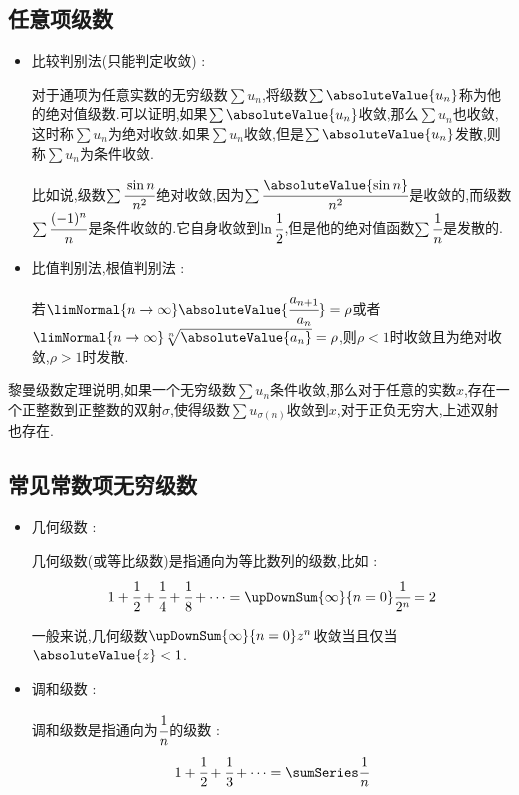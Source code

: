 {{{  \subsection{任意项级数}{

    \begin{itemize}
      \item {
            比较判别法(只能判定收敛) :

            对于通项为任意实数的无穷级数$\sum u_n$,将级数$\sum \absoluteValue{u_n}$称为他的绝对值级数.可以证明,如果$\sum \absoluteValue{u_n}$收敛,那么$\sum u_n$也收敛,这时称$\sum u_n$为绝对收敛.如果$\sum u_n$收敛,但是$\sum \absoluteValue{u_n}$发散,则称$\sum u_n$为条件收敛.

            比如说,级数$\sum \cfrac{\sin n}{n^2}$绝对收敛,因为$\sum \cfrac{\absoluteValue{\sin n}}{n^2}$是收敛的,而级数$\sum \cfrac{(-1)^n}{n}$是条件收敛的.它自身收敛到$\ln\cfrac{1}{2}$,但是他的绝对值函数$\sum \cfrac{1}{n}$是发散的.
            }
      \item {
            比值判别法,根值判别法 :

            若$\limNormal{n \to \infty} \absoluteValue{\cfrac{a_{n + 1}}{a_n}} = \rho$或者$\limNormal{n \to \infty}\sqrt[n]{\absoluteValue{a_n}} = \rho$,则$\rho < 1$时收敛且为绝对收敛,$\rho > 1$时发散.
            }
    \end{itemize}

    黎曼级数定理说明,如果一个无穷级数$\sum u_n$条件收敛,那么对于任意的实数$x$,存在一个正整数到正整数的双射$\sigma$,使得级数$\sum u_{\sigma(n)}$收敛到$x$,对于正负无穷大,上述双射也存在.
  }%

  \subsection{常见常数项无穷级数}{

    \begin{itemize}
      \item {
            几何级数 :

            几何级数(或等比级数)是指通向为等比数列的级数,比如 :
            $$
              1 + \cfrac{1}{2} + \cfrac{1}{4} + \cfrac{1}{8} + \dots = \upDownSum{\infty}{n = 0} \cfrac{1}{2^n} = 2
            $$

            一般来说,几何级数$\upDownSum{\infty}{n = 0}z^n$收敛当且仅当$\absoluteValue{z} < 1$.
            }
      \item{
            调和级数 :

            调和级数是指通向为$\cfrac{1}{n}$的级数 :
            $$
              1 + \cfrac{1}{2} + \cfrac{1}{3} + \dots = \sumSeries \cfrac{1}{n}
            $$

}
\end{itemize}}}}}

